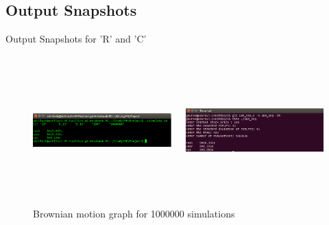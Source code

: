 \documentclass{beamer}
\begin{document}
\subsection{Output Snapshots}

\begin{frame}{Output Snapshots for 'R' and 'C'}{}
\begin{figure}
\begin{columns}[t]

\includegraphics[width=6cm,height=5cm]{1000000}\\


\includegraphics[width=6cm,height=5cm]{1000000_GBM_SERIAL}\\

\end{columns}

\caption{Brownian motion graph for 1000000 simulations}

\end{figure}
  
\end{frame}
\end{document}
